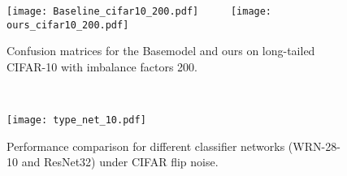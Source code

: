 \documentclass{article}
\begin{document}
	\begin{figure}[pt] \vspace{2mm}
		\begin{minipage}{0.48\textwidth}
\texttt{[image: Baseline\_cifar10\_200.pdf]} \ \ \ \ \
\texttt{[image: ours\_cifar10\_200.pdf]}\vspace{0mm}
			\caption{Confusion matrices for the Basemodel and ours on long-tailed CIFAR-10 with imbalance factors 200.}
			\label{conmatrix}
		\end{minipage} \ \ \ \ \ \ \ \ \
		\begin{minipage}{0.48\textwidth}
			\centering
\texttt{[image: type\_net\_10.pdf]} \vspace{-5mm}
			\caption{Performance comparison for different classifier networks (WRN-28-10 and ResNet32) under CIFAR flip noise.} \label{fignet:a}
		\end{minipage}\vspace{0mm}
	\end{figure}
	
\end{document}
